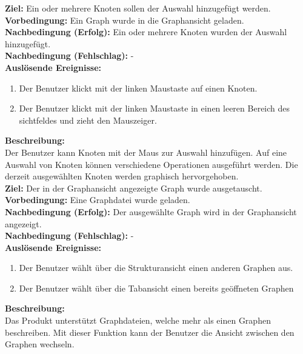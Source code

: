 \label{fa:selekt_knoten}
\textbf{Ziel:} Ein oder mehrere Knoten sollen der Auswahl hinzugefügt werden.\\
\textbf{Vorbedingung:} Ein Graph wurde in die Graphansicht geladen.\\
\textbf{Nachbedingung (Erfolg):} Ein oder mehrere Knoten wurden der Auswahl hinzugefügt.\\
\textbf{Nachbedingung (Fehlschlag):} -\\
\textbf{Auslösende Ereignisse:}
\begin{enumerate}[nolistsep, label=(\alph*)]
  \item Der Benutzer klickt mit der linken Maustaste auf einen Knoten.
  \item Der Benutzer klickt mit der linken Maustaste in einen leeren Bereich des \gls{sichtfeld}es und zieht den Mauszeiger.
\end{enumerate}
\textbf{Beschreibung:}\\
Der Benutzer kann Knoten mit der Maus zur Auswahl hinzufügen.
Auf eine Auswahl von Knoten können verschiedene Operationen ausgeführt werden. %
Die derzeit ausgewählten Knoten werden graphisch hervorgehoben.\\

\label{fa:graphwechsel}
\textbf{Ziel:} Der in der Graphansicht angezeigte Graph wurde ausgetauscht. \\
\textbf{Vorbedingung:} Eine Graphdatei wurde geladen.\\
\textbf{Nachbedingung (Erfolg):} Der ausgewählte Graph wird in der Graphansicht angezeigt.\\
\textbf{Nachbedingung (Fehlschlag):} -\\
\textbf{Auslösende Ereignisse:}
\begin{enumerate}[nolistsep, label=(\alph*)]
  \item Der Benutzer wählt über die Strukturansicht einen anderen Graphen aus.
  \item Der Benutzer wählt über die Tabansicht einen bereits geöffneten Graphen %
\end{enumerate}
\textbf{Beschreibung:}\\
Das Produkt unterstützt Graphdateien, welche mehr als einen Graphen beschreiben.
Mit dieser Funktion kann der Benutzer die Ansicht zwischen den Graphen wechseln.

